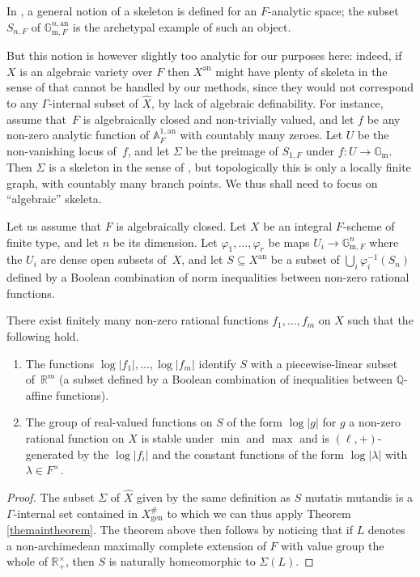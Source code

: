 \documentclass[JEP,XML,SOM,Unicode,ThmDefs,NoEqCountersInSection,published]{cedram}
\newcommand{\abs}[1]{\mathopen|#1\mathclose|}
\newcommand{\an}{^{\mathrm{an}}}
\newcommand{\gm}{\bG_{\mathrm m}}
\newcommand{\bA}{\mathbb A}
\newcommand{\bG}{\mathbb G}
\newcommand{\Q}{\mathbb Q}
\newcommand{\R}{\mathbb R}
\let\phi\varphi
\theoremstyle{plain}
\theoremstyle{definition}
\begin{document}
In \cite[4.6]{confluentes}, a general notion of a skeleton is defined for an
$F$-analytic space; the subset $S_{n,F}$
of $\bG_{\mathrm m,F}^{n,\mathrm{an}}$
is the archetypal example of such an object.

But this notion is however slightly too analytic for our
purposes here: indeed, if~$X$ is an algebraic variety
over $F$ then $X\an$ might have plenty of skeleta
in the sense of \cite{confluentes} that cannot be handled by our methods, since they would not
correspond to any $\Gamma$-internal subset of $\widehat X$, by lack of algebraic definability.
For instance, assume that~$F$ is algebraically closed and non-trivially valued, and let $f$ be any non-zero analytic function of $\bA^{1,\mathrm{an}}_F$ with countably many zeroes. Let $U$ be the non-vanishing locus of~$f$, and let $\Sigma$ be the preimage of $S_{1,F}$ under $f
\colon U\to \gm$. Then $\Sigma$ is a skeleton in the sense of \cite{confluentes}, but topologically this is only a locally finite graph, with countably many branch points.
We thus shall need to focus on ``algebraic'' skeleta.

\begin{theo}\label{mtberk}
Let us assume that $F$ is algebraically closed. Let $X$ be an integral $F$-scheme of finite type, and let $n$ be its dimension. Let $\phi_1,\ldots,\phi_r$ be maps $U_i\to \bG_{\mathrm m, F}^n$ where the $U_i$ are dense open subsets of~$X$, and let $S\subseteq X\an$ be a subset of
$\bigcup_i \phi_i^{-1}(S_n)$ defined by a Boolean combination of norm inequalities between non-zero rational functions.

There exist finitely many non-zero rational functions $f_1,\ldots, f_m$ on $X$
such that the following hold.

\begin{enumerate}
\item
The functions $\log \abs{f_1},\ldots, \log \abs{f_m}$ identify $S$
with a piecewise-linear subset of~$\R^m$ (\ie a subset defined by a Boolean combination
of inequalities between $\Q$-affine functions).
\item The group of real-valued functions on $S$ of the form $\log \abs g$ for
$g$ a non-zero rational function on $X$
is stable under $\min$ and $\max$ and is
$(\ell,+)$-generated by the $\log \abs{f_i}$
and the constant functions of the form $\log \abs{\lambda}$ with $\lambda \in F^\times$.
\end{enumerate}
\end{theo}

\begin{proof}
The subset $\Sigma$ of $\widehat X$ given by the same definition as $S$ mutatis mutandis is a $\Gamma$-internal set
contained in $X^\#_{\mathrm{gen}}$ to which we can thus apply
Theorem \ref{themaintheorem}. The theorem above then follows by noticing that if $L$ denotes a non-archimedean maximally complete extension of $F$ with value group the whole of $\R_+^\times$, then $S$ is naturally homeomorphic to $\Sigma (L)$.
\end{proof}
\end{document}
